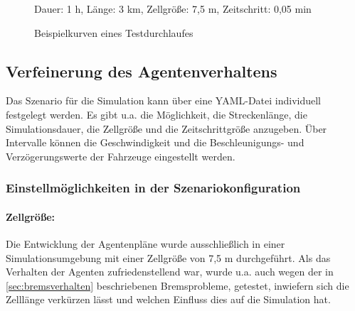 \begin{figure}[hptb]
  \centering 
   \qquad
  \caption{Beispielkurven eines Testdurchlaufes}{\footnotesize Dauer: 1 h, Länge: 3 km, Zellgröße: 7,5 m, Zeitschritt: 0,05 min} 
  \label{figure:test-cell-speedcurves}
\end{figure}






\subsection{Verfeinerung des Agentenverhaltens}
\label{sec:verfeinerung-agentenplan}

Das Szenario für die Simulation kann über eine YAML-Datei individuell festgelegt werden.
Es gibt u.a. die Möglichkeit, die Streckenlänge, die Simulationsdauer, die Zellgröße und die Zeitschrittgröße anzugeben. 
Über Intervalle können die Geschwindigkeit und die Beschleunigungs- und Verzögerungswerte der Fahrzeuge eingestellt werden.



\subsubsection{Einstellmöglichkeiten in der Szenariokonfiguration}
\label{einstellungen-szenario}


\paragraph*{Zellgröße:}
\label{zellgroesse-zeitschritte}
Die Entwicklung der Agentenpläne wurde ausschließlich in einer Simulationsumgebung mit einer Zellgröße von 7,5 m durchgeführt.
Als das Verhalten der Agenten zufriedenstellend war, wurde u.a. auch wegen der in \cref{sec:bremsverhalten} beschriebenen Bremsprobleme, getestet, inwiefern sich die Zelllänge verkürzen lässt und welchen Einfluss dies auf die Simulation hat.


